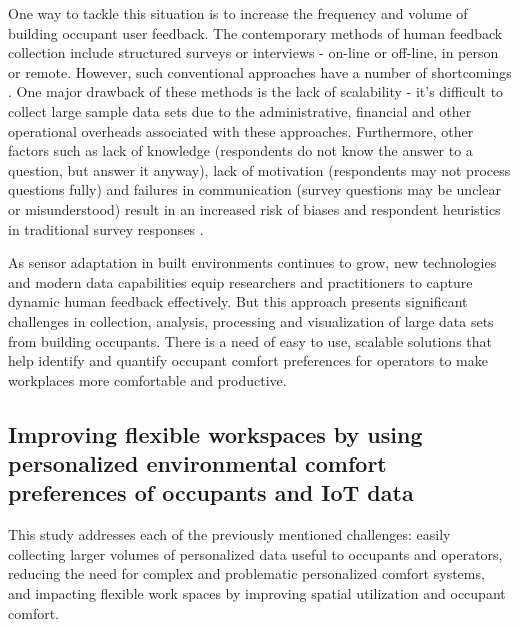 \documentclass[]{interact}
\theoremstyle{plain}%
\theoremstyle{definition}
\theoremstyle{remark}
\begin{document}
One way to tackle this situation is to increase the frequency and volume of building occupant user feedback. The contemporary methods of human feedback collection include structured surveys or interviews - on-line or off-line, in person or remote. However, such conventional approaches have a number of shortcomings \cite{oecd}. One major drawback of these methods is the lack of scalability - it’s difficult to collect large sample data sets due to the administrative, financial and other operational overheads associated with these approaches. Furthermore, other factors such as lack of knowledge (respondents do not know the answer to a question, but answer it anyway), lack of motivation (respondents may not process questions fully) and failures in communication (survey questions may be unclear or misunderstood) result in an increased risk of biases and respondent heuristics in traditional survey responses \cite{bradburn2004asking}.

As sensor adaptation in built environments continues to grow, new technologies and modern data capabilities equip researchers and practitioners to capture dynamic human feedback effectively. But this approach presents significant challenges in collection, analysis, processing and visualization of large data sets from building occupants. There is a need of easy to use, scalable solutions that help identify and quantify occupant comfort preferences for operators to make workplaces more comfortable and productive.


\subsection{Improving flexible workspaces by using personalized environmental comfort preferences of occupants and IoT data}

This study addresses each of the previously mentioned challenges: easily collecting larger volumes of personalized data useful to occupants and operators, reducing the need for complex and problematic personalized comfort systems, and impacting flexible work spaces by improving spatial utilization and occupant comfort. 
\end{document}
